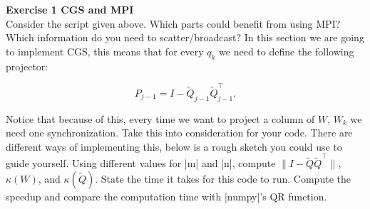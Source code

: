 \documentclass[11pt]{article}
\begin{document}
\bigskip

{\bf{Exercise 1 CGS and MPI}}\\

Consider the script given above. Which parts could benefit from using MPI? Which information do you need to scatter/broadcast? In this section we are going to implement CGS, this means that for every $q_k$ we need to define the following projector:

\[ P_{j-1} = I - \tilde{Q}_{j-1} \tilde{Q}^\top_{j-1}. \]

Notice that because of this, every time we want to project a column of $W$, $W_k$ we need one synchronization. Take this into consideration for your code. There are different ways of implementing this, below is a rough sketch you could use to guide yourself. Using different values for |m| and |n|, compute $\|I - \tilde{Q}\tilde{Q}^\top\|$, $\kappa(W)$, and $\kappa(\tilde{Q})$. State the time it takes for this code to run. Compute the speedup and compare the computation time with |numpy|'s QR function.


\end{document}
